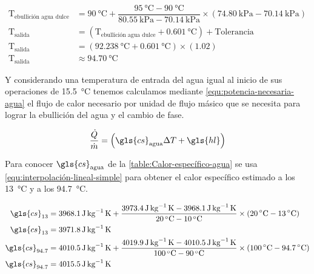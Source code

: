 			\begin{align*}
				\text{T}_{\text{ebullición agua dulce}} &= \qty{90}{\degreeCelsius} + \dfrac{\qty{95}{\degreeCelsius} - \qty{90}{\degreeCelsius}}{\qty{80.55}{\kilo\pascal}-\qty{70.14}{\kilo\pascal}} \times (\qty{74.80}{\kilo\pascal} - \qty{70.14}{\kilo\pascal})\\
				\text{T}_{\text{salida}} &= (\text{T}_{\text{ebullición agua dulce}} + \qty{0.601}{\degreeCelsius}) + \text{Tolerancia}\\
				\text{T}_{\text{salida}} &= (\qty{92.238}{\degreeCelsius} + \qty{0.601}{\degreeCelsius}) \times (1.02)\\
				\text{T}_{\text{salida}} &\approx \qty{94.70}{\degreeCelsius}
			\end{align*}
			
			Y considerando una temperatura de entrada del agua igual al inicio de sus operaciones de \qty{15.5}{\degreeCelsius} tenemos calculamos mediante \eqref{equ:potencia-necesaria-agua} el flujo de calor necesario por unidad de flujo másico que se necesita para lograr la ebullición del agua y el cambio de fase.
			
			\begin{equation}\label{equ:potencia-necesaria-agua}
				\dfrac{\dot{Q}}{\dot{m}} = \left(\gls{cs}_{\text{agua}} \Delta T + \gls{hl}\right)
			\end{equation}
			
			Para conocer $\gls{cs}_{\text{agua}}$ de la \cref{table:Calor-específico-agua} se usa \eqref{equ:interpolación-lineal-simple} para obtener el calor específico estimado a los \qty{13}{\degreeCelsius} y a los \qty{94.7}{\degreeCelsius}.
			
			\begin{align*}
				\gls{cs}_{13} &= \qty{3968.1}{\joule\per\kg\kelvin} + \dfrac{\qty{3973.4}{\joule\per\kg\kelvin} - \qty{3968.1}{\joule\per\kg\kelvin}}{\qty{20}{\degreeCelsius}-\qty{10}{\degreeCelsius}} \times (\qty{20}{\degreeCelsius} - \qty{13}{\degreeCelsius})\\
				\gls{cs}_{13} &= \qty{3971.8}{\joule\per\kg\kelvin}\\
				\gls{cs}_{94.7} &= \qty{4010.5}{\joule\per\kg\kelvin} + \dfrac{\qty{4019.9}{\joule\per\kg\kelvin} - \qty{4010.5}{\joule\per\kg\kelvin}}{\qty{100}{\degreeCelsius}-\qty{90}{\degreeCelsius}} \times (\qty{100}{\degreeCelsius} - \qty{94.7}{\degreeCelsius})\\
				\gls{cs}_{94.7} &= \qty{4015.5}{\joule\per\kg\kelvin}
			\end{align*}
			
